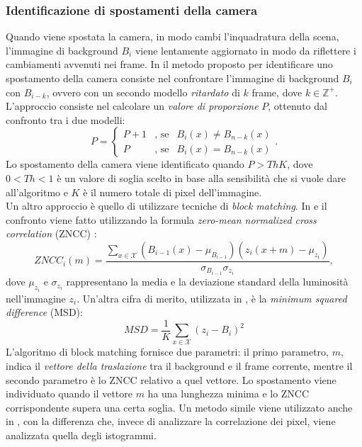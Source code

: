 \subsubsection{Identificazione di spostamenti della camera}
Quando viene spostata la camera, in modo cambi l'inquadratura della scena, l'immagine di background $B_i$ viene lentamente aggiornato in modo da riflettere i cambiamenti avvenuti nei frame. 
In \cite{saglam2009real} il metodo proposto per identificare uno spostamento della camera consiste nel confrontare l'immagine di background $B_i$ con $B_{i-k}$, ovvero con un secondo modello \textit{ritardato} di $k$ frame, dove $k \in \mathbb{Z}^+$.
L'approccio consiste nel calcolare un \textit{valore di proporzione} $P$, ottenuto dal confronto tra i due modelli:
\[
\label{eq:displEqSaglam}
P=\left\{ \begin{array} {lcl}
P+1 & \mbox{, se} & B_i(x) \neq B_{n-k}(x) \\
P & \mbox{, se} & B_i(x) = B_{n-k}(x) \end{array} \right. .
\]
Lo spostamento della camera viene identificato quando $P > Th K$, dove $0<Th<1$ \`e un valore di soglia scelto in base alla sensibilit\`a che si vuole dare all'algoritmo e $K$ \`e il numero totale di pixel dell'immagine.\\
Un altro approccio \`e quello di utilizzare tecniche di \textit{block matching}.
In \cite{gil2007automatic} e \cite{harasse2004automated} il confronto viene fatto utilizzando la formula \textit{zero-mean normalized cross correlation} (ZNCC) \cite{roma2002comparative}:
\[
ZNCC_i(m) = \frac{\sum_{x \in \mathcal{X}}(B_{i-1}(x)- \mu_{B_{i-1}})(z_i(x+m)-\mu_{z_i})}{\sigma_{B_{i-1}} \sigma_{z_i}},
\]
dove $\mu_{z_i}$ e $\sigma_{z_i}$ rappresentano la media e la deviazione standard della luminosit\`a nell'immagine $z_i$.
Un'altra cifra di merito, utilizzata in \cite{ellwart2012camera}, \`e la \textit{minimum squared difference} (MSD):
\[
MSD = \frac{1}{K}\sum_{x \in \mathcal{X}}(z_i - B_i)^2
\]
L'algoritmo di block matching fornisce due parametri:
il primo parametro, $m$, indica il \textit{vettore della traslazione} tra il background e il frame corrente, mentre il secondo parametro \`e lo ZNCC relativo a quel vettore.
Lo spostamento viene individuato quando il vettore $m$ ha una lunghezza minima e lo ZNCC corrispondente supera una certa soglia.
Un metodo simile viene utilizzato anche in \cite{kryjak2012fpga}, con la differenza che, invece di analizzare la correlazione dei pixel, viene analizzata quella degli istogrammi. 

